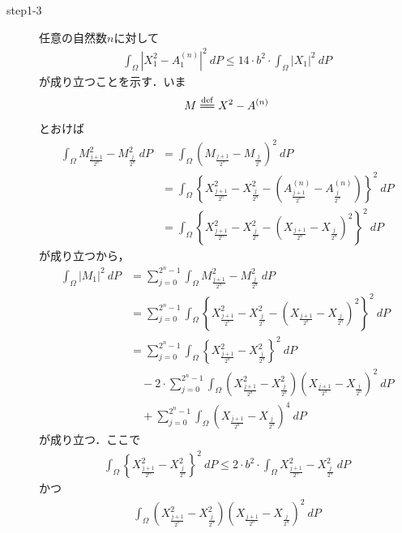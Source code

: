 \begin{sketch}
\begin{description}
			\item[step1-3]
				任意の自然数$n$に対して
				\begin{align}
					\int_\Omega \left|X_{1}^2 - A_{1}^{(n)}\right|^2\ dP
					\leq 14 \cdot b^2 \cdot \int_\Omega \left|X_{1}\right|^2\ dP
				\end{align}
				が成り立つことを示す．いま
				\begin{align}
					M \defeq X^2 - A^{(n)}
				\end{align}
				とおけば
				\begin{align}
					\int_\Omega M_{\frac{j+1}{2^n}}^2 - M_{\frac{j}{2^n}}^2\ dP
					&= \int_\Omega \left(M_{\frac{j+1}{2^n}} - M_{\frac{j}{2^n}} \right)^2\ dP \\
					&= \int_\Omega \left\{ X^2_{\frac{j+1}{2^n}} - X^2_{\frac{j}{2^n}} -
					\left(A^{(n)}_{\frac{j+1}{2^n}} - A^{(n)}_{\frac{j}{2^n}}\right) \right\}^2\ dP \\
					&= \int_\Omega \left\{ X^2_{\frac{j+1}{2^n}} - X^2_{\frac{j}{2^n}} -
					\left(X_{\frac{j+1}{2^n}} - X_{\frac{j}{2^n}}\right)^2 \right\}^2\ dP
				\end{align}
				が成り立つから，
				\begin{align}
					\int_\Omega \left|M_{1}\right|^2\ dP
					&= \sum_{j=0}^{2^n-1} \int_\Omega M_{\frac{j+1}{2^n}}^2 - M_{\frac{j}{2^n}}^2\ dP \\
					&= \sum_{j=0}^{2^n-1} \int_\Omega \left\{ X^2_{\frac{j+1}{2^n}} - X^2_{\frac{j}{2^n}} -
					\left(X_{\frac{j+1}{2^n}} - X_{\frac{j}{2^n}}\right)^2 \right\}^2\ dP \\
					&= \sum_{j=0}^{2^n-1} \int_\Omega \left\{ X^2_{\frac{j+1}{2^n}} - X^2_{\frac{j}{2^n}} \right\}^2\ dP \\
						&\quad - 2 \cdot \sum_{j=0}^{2^n-1} \int_\Omega \left( X^2_{\frac{j+1}{2^n}} - X^2_{\frac{j}{2^n}} \right) \left(X_{\frac{j+1}{2^n}} - X_{\frac{j}{2^n}}\right)^2\ dP \\
						&\quad + \sum_{j=0}^{2^n-1} \int_\Omega \left(X_{\frac{j+1}{2^n}} - X_{\frac{j}{2^n}}\right)^4\ dP
					\label{fom:thm_decomposition_of_square_integrable_martingales_1}
				\end{align}
				が成り立つ．ここで
				\begin{align}
					\int_\Omega \left\{ X^2_{\frac{j+1}{2^n}} - X^2_{\frac{j}{2^n}} \right\}^2\ dP
					\leq 2 \cdot b^2 \cdot \int_\Omega X^2_{\frac{j+1}{2^n}} - X^2_{\frac{j}{2^n}}\ dP
				\end{align}
				かつ
				\begin{align}
					\int_\Omega \left( X^2_{\frac{j+1}{2^n}} - X^2_{\frac{j}{2^n}} \right) \left(X_{\frac{j+1}{2^n}} - X_{\frac{j}{2^n}}\right)^2\ dP

\end{align}
\end{description}
\end{sketch}
